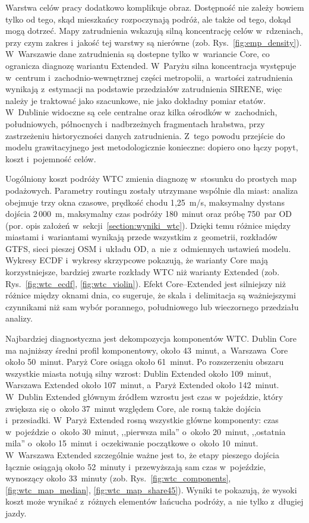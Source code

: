 \documentclass{pracamgr}
\begin{document}
Warstwa celów pracy dodatkowo komplikuje obraz. Dostępność nie zależy bowiem tylko od tego, skąd mieszkańcy rozpoczynają podróż, ale także od tego, dokąd mogą dotrzeć. Mapy zatrudnienia wskazują silną koncentrację celów w~rdzeniach, przy czym zakres i~jakość tej warstwy są nierówne (zob. Rys.~\ref{fig:emp_density}). W~Warszawie dane zatrudnienia są dostepne tylko w~wariancie \mbox{Core}, co ogranicza diagnozę wariantu \mbox{Extended}. W~Paryżu silna koncentracja występuje w~centrum i~zachodnio-wewnętrznej części metropolii, a~wartości zatrudnienia wynikają z~estymacji na podstawie przedziałów zatrudnienia \mbox{SIRENE}, więc należy je traktować jako szacunkowe, nie jako dokładny pomiar etatów. W~Dublinie widoczne są cele centralne oraz kilka ośrodków w~zachodnich, południowych, północnych i~nadbrzeżnych fragmentach hrabstwa, przy zastrzeżeniu historyczności danych zatrudnienia. Z~tego powodu przejście do modelu grawitacyjnego jest metodologicznie konieczne: dopiero ono łączy popyt, koszt i~pojemność celów.

Uogólniony koszt podróży \mbox{WTC} zmienia diagnozę w~stosunku do prostych map podażowych. Parametry routingu zostały utrzymane wspólnie dla miast: analiza obejmuje trzy okna czasowe, prędkość chodu 1{,}25~m/s, maksymalny dystans dojścia 2\,000~m, maksymalny czas podróży 180~minut oraz próbę 750~par \mbox{OD} (por. opis założeń w~sekcji~\ref{section:wyniki_wtc}). Dzięki temu różnice między miastami i~wariantami wynikają przede wszystkim z~geometrii, rozkładów \mbox{GTFS}, sieci pieszej \mbox{OSM} i~układu \mbox{OD}, a~nie z~odmiennych ustawień modelu. Wykresy \mbox{ECDF} i~wykresy skrzypcowe pokazują, że warianty \mbox{Core} mają korzystniejsze, bardziej zwarte rozkłady \mbox{WTC} niż warianty \mbox{Extended} (zob. Rys.~\ref{fig:wtc_ecdf}, \ref{fig:wtc_violin}). Efekt \mbox{Core--Extended} jest silniejszy niż różnice między oknami dnia, co sugeruje, że skala i~delimitacja są ważniejszymi czynnikami niż sam wybór porannego, południowego lub wieczornego przedziału analizy.

Najbardziej diagnostyczna jest dekompozycja komponentów \mbox{WTC}. Dublin Core ma najniższy średni profil komponentowy, około 43~minut, a~\mbox{Warszawa~Core} około 50~minut. Paryż Core osiąga około 61~minut. Po rozszerzeniu obszaru wszystkie miasta notują silny wzrost: Dublin Extended około 109~minut, Warszawa Extended około 107~minut, a~Paryż Extended około 142~minut. W~Dublin Extended głównym źródłem wzrostu jest czas w~pojeździe, który zwiększa się o~około 37~minut względem \mbox{Core}, ale rosną także dojścia i~przesiadki. W~Paryż Extended rosną wszystkie główne komponenty: czas w~pojeździe o~około 30~minut, ,,pierwsza mila'' o~około 20~minut, ,,ostatnia mila'' o~około 15~minut i~oczekiwanie początkowe o~około 10~minut. W~Warszawa Extended szczególnie ważne jest to, że etapy pieszego dojścia łącznie osiągają około 52~minuty i~przewyższają sam czas w~pojeździe, wynoszący około 33~minuty (zob. Rys.~\ref{fig:wtc_components}, \ref{fig:wtc_map_median}, \ref{fig:wtc_map_share45}). Wyniki te pokazują, że wysoki koszt może wynikać z~różnych elementów łańcucha podróży, a~nie tylko z~długiej jazdy.
\end{document}
